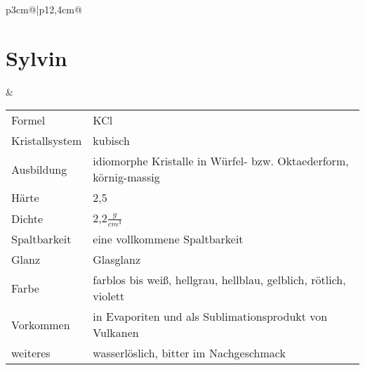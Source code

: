 \documentclass[a4, 12pt]{scrreprt}
\begin{document}
\begin{tabular}{p{3cm}@{}|p{}@{}}
\section{Sylvin} & 
	\begin{tabular}{p{3cm}@{}p{9cm}@{}}
	Formel & KCl\\
	Kristallsystem & kubisch\\
	Ausbildung & idiomorphe Kristalle in Würfel- bzw. Oktaederform, körnig-massig\\
	Härte & 2,5\\
	Dichte & 2,2$\frac{g}{cm^3}$\\
	Spaltbarkeit & eine vollkommene Spaltbarkeit\\
	Glanz & Glasglanz\\
	Farbe & farblos bis weiß, hellgrau, hellblau, gelblich, rötlich, violett\\
	Vorkommen & in Evaporiten und als Sublimationsprodukt von Vulkanen\\
	weiteres & wasserlöslich, bitter im Nachgeschmack
	\end{tabular}\\
\hline
\end{tabular}
\end{document}
